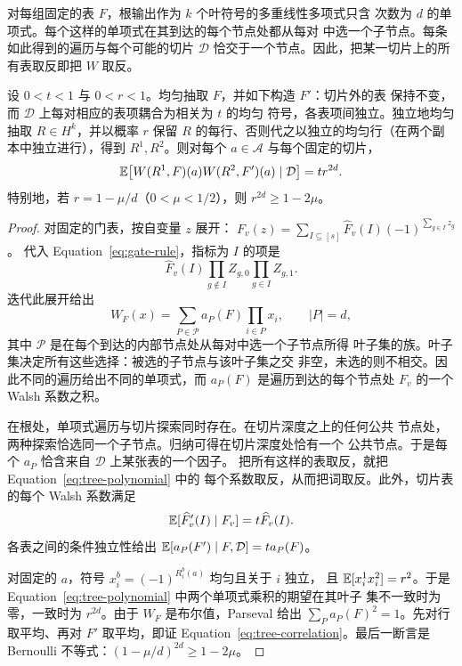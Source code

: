 \begin{lemma}[互补遍历与相关性]
\label{lem:tree-correlation}
对每组固定的表 $F$，根输出作为 $k$ 个叶符号的多重线性多项式只含
次数为 $d$ 的单项式。每个这样的单项式在其到达的每个节点处都从每对
中选一个子节点。每条如此得到的遍历与每个可能的切片 $\mathcal D$
恰交于一个节点。因此，把某一切片上的所有表取反即把 $W$ 取反。

设 $0<t<1$ 与 $0<r<1$。均匀抽取 $F$，并如下构造 $F'$：切片外的表
保持不变，而 $\mathcal D$ 上每对相应的表项耦合为相关为 $t$ 的均匀
符号，各表项间独立。独立地均匀抽取 $R\in H^k$，并以概率 $r$ 保留
$R$ 的每行、否则代之以独立的均匀行（在两个副本中独立进行），得到
$R^1,R^2$。则对每个 $a\in\mathcal A$ 与每个固定的切片，
\begin{equation}
 \mathbb E\bigl[W(R^1,F)(a)W(R^2,F')(a)\mid\mathcal D\bigr]
       =t r^{2d}.
 \label{eq:tree-correlation}
\end{equation}
特别地，若 $r=1-\mu/d$（$0<\mu<1/2$），则 $r^{2d}\ge1-2\mu$。
\end{lemma}

\begin{proof}
对固定的门表，按自变量 $z$ 展开：
$F_v(z)=\sum_{I\subseteq[s]}\widehat F_v(I)(-1)^{\sum_{g\in I}z_g}$。
代入 Equation~\eqref{eq:gate-rule}，指标为 $I$ 的项是
\[
 \widehat F_v(I)
 \prod_{g\notin I}Z_{g,0}\prod_{g\in I}Z_{g,1}.
\]
迭代此展开给出
\begin{equation}
 W_F(x)=\sum_{P\in\mathscr P}a_P(F)\prod_{i\in P}x_i,
 \qquad |P|=d,
 \label{eq:tree-polynomial}
\end{equation}
其中 $\mathscr P$ 是在每个到达的内部节点处从每对中选一个子节点所得
叶子集的族。叶子集决定所有这些选择：被选的子节点与该叶子集之交
非空，未选的则不相交。因此不同的遍历给出不同的单项式，而
$a_P(F)$ 是遍历到达的每个节点处 $F_v$ 的一个 Walsh 系数之积。

在根处，单项式遍历与切片探索同时存在。在切片深度之上的任何公共
节点处，两种探索恰选同一个子节点。归纳可得在切片深度处恰有一个
公共节点。于是每个 $a_P$ 恰含来自 $\mathcal D$ 上某张表的一个因子。
把所有这样的表取反，就把 Equation~\eqref{eq:tree-polynomial} 中的
每个系数取反，从而把词取反。此外，切片表的每个 Walsh 系数满足
\[
 \mathbb E[\widehat F'_v(I)\mid F_v]=t\widehat F_v(I).
\]
各表之间的条件独立性给出
$\mathbb E[a_P(F')\mid F,\mathcal D]=t a_P(F)$。

对固定的 $a$，符号 $x_i^b=(-1)^{R_i^b(a)}$ 均匀且关于 $i$ 独立，
且 $\mathbb E[x_i^1x_i^2]=r^2$。于是
Equation~\eqref{eq:tree-polynomial} 中两个单项式乘积的期望在其叶子
集不一致时为零，一致时为 $r^{2d}$。由于 $W_F$ 是布尔值，Parseval
给出 $\sum_P a_P(F)^2=1$。先对行取平均、再对 $F'$ 取平均，即证
Equation~\eqref{eq:tree-correlation}。最后一断言是 Bernoulli
不等式：$(1-\mu/d)^{2d}\ge1-2\mu$。
\end{proof}

